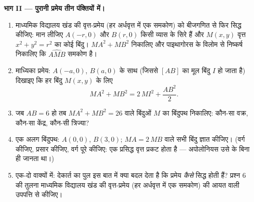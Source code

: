 \begin{problem}
\medskip
\noindent\textbf{भाग II --- पुरानी प्रमेय तीन पंक्तियों में।}
\begin{enumerate}[resume]
  \item माध्यमिक विद्यालय खंड की वृत्त-प्रमेय (हर अर्धवृत्त में एक समकोण)
        को बीजगणित से फिर सिद्ध कीजिए: मान लीजिए $A(-r, 0)$ और $B(r, 0)$ किसी व्यास
        के सिरे हैं और $M(x, y)$ वृत्त $x^2 + y^2 = r^2$ का कोई बिंदु। $MA^2 + MB^2$ निकालिए और
        पाइथागोरस के विलोम से निष्कर्ष निकालिए कि $\widehat{AMB}$ समकोण है।
  \item माध्यिका प्रमेय: $A(-a, 0)$, $B(a, 0)$ के साथ (जिससे $[AB]$ का 
        मूल बिंदु $I$ हो जाता है) दिखाइए कि हर बिंदु $M(x, y)$ के लिए
        \[
        MA^2 + MB^2 = 2\,MI^2 + \frac{AB^2}{2} .
        \]
  \item जब $AB = 6$ हो तब $MA^2 + MB^2 = 26$ वाले बिंदुओं $M$ का बिंदुपथ निकालिए:
        कौन-सा वक्र, कौन-सा केंद्र, कौन-सी त्रिज्या?
  \item एक अलग बिंदुपथ: $A(0,0)$, $B(3,0)$; $MA = 2\,MB$ वाले सभी बिंदु ज्ञात कीजिए।
        (वर्ग कीजिए, प्रसार कीजिए, वर्ग पूरे कीजिए: एक प्रसिद्ध वृत्त
        प्रकट होता है --- अपोलोनियस उसे  के बिना ही जानता
        था।)
  \item एक-दो वाक्यों में: देकार्त का पुल इस बात में क्या बदल देता है कि
        प्रमेय \emph{कैसे} सिद्ध होती हैं? प्रश्न 6 की तुलना माध्यमिक
        विद्यालय खंड की वृत्त-प्रमेय (हर अर्धवृत्त में एक समकोण) की आयत
        वाली उपपत्ति से कीजिए।
\end{enumerate}


\end{problem}
